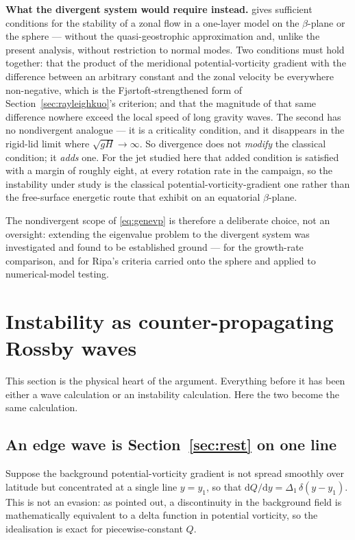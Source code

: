 \documentclass[11pt,a4paper]{article}
\newcommand{\dd}{\mathrm{d}}
\begin{document}
\medskip
\noindent\textbf{What the divergent system would require instead.}
\citet{ripa1983} gives sufficient conditions for the stability of a zonal flow in
a one-layer model on the $\beta$-plane or the sphere --- without the
quasi-geostrophic approximation and, unlike the present analysis, without
restriction to normal modes. Two conditions must hold together: that the product
of the meridional potential-vorticity gradient with the difference between an
arbitrary constant and the zonal velocity be everywhere non-negative, which is
the Fj\o{}rtoft-strengthened form of Section~\ref{sec:rayleighkuo}'s criterion;
and that the magnitude of that same difference nowhere exceed the local speed of
long gravity waves. The second has no nondivergent analogue --- it is a
criticality condition, and it disappears in the rigid-lid limit where
$\sqrt{gH}\to\infty$. So divergence does not \emph{modify} the classical
condition; it \emph{adds} one. For the jet studied here that added condition is
satisfied with a margin of roughly eight, at every rotation rate in the
campaign, so the instability under study is the classical
potential-vorticity-gradient one rather than the free-surface energetic route
that \citet{hayashi1987} exhibit on an equatorial $\beta$-plane.

The nondivergent scope of \eqref{eq:genevp} is therefore a deliberate choice, not
an oversight: extending the eigenvalue problem to the divergent system was
investigated and found to be established ground --- \citet{paldor2020} for the
growth-rate comparison, and \citet{white2009} for Ripa's criteria carried onto
the sphere and applied to numerical-model testing.

\section{Instability as counter-propagating Rossby waves}
\label{sec:crw}

This section is the physical heart of the argument. Everything before it has
been either a wave calculation or an instability calculation. Here the two
become the same calculation.

\subsection{An edge wave is Section~\ref{sec:rest} on one line}

Suppose the background potential-vorticity gradient is not spread smoothly over
latitude but concentrated at a single line $y = y_1$, so that
$\dd Q/\dd y = \Delta_1\,\delta(y - y_1)$. This is not an evasion: as
\citet{bretherton1966} pointed out, a discontinuity in the background field is
mathematically equivalent to a delta function in potential vorticity, so the
idealisation is exact for piecewise-constant $Q$.
\end{document}
